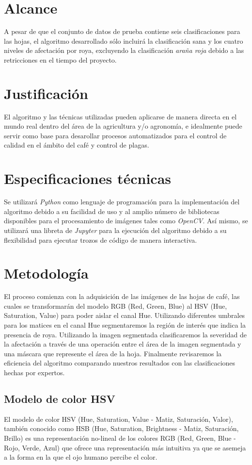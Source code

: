 \section{Alcance}
A pesar de que el conjunto de datos de prueba contiene seis clasificaciones para las hojas, el algoritmo desarrollado sólo incluirá la clasificación sana y los cuatro niveles de afectación por roya, excluyendo la clasificación \textit{araña roja} debido a las retricciones en el tiempo del proyecto.

\section{Justificación}
El algoritmo y las técnicas utilizadas pueden aplicarse de manera directa en el mundo real dentro del área de la agricultura y/o agronomía, e idealmente puede servir como base para desarollar procesos automatizados para el control de calidad en el ámbito del café y control de plagas.
 
\section{Especificaciones técnicas}
Se utilizará \textit{Python} como lenguaje de programación para la implementación del algoritmo debido a su facilidad de uso y al amplio número de bibliotecas disponibles para el procesamiento de imágenes tales como \textit{OpenCV}. Así mismo, se utilizará una libreta de \textit{Jupyter} para la ejecución del algoritmo debido a su flexibilidad para ejecutar trozos de código de manera interactiva.

\section{Metodología}
El proceso comienza con la adquisición de las imágenes de las hojas de café, las cuales se transformarán del modelo RGB (Red, Green, Blue) al HSV (Hue, Saturation, Value) para poder aislar el canal Hue. Utilizando diferentes umbrales para los matices en el canal Hue segmentaremos la región de interés que indica la presencia de roya. Utilizando la imagen segmentada clasificaremos la severidad de la afectación a través de una operación entre el área de la imagen segmentada y una máscara que represente el área de la hoja. Finalmente revisaremos la eficiencia del algoritmo comparando nuestros resultados con las clasificaciones hechas por expertos.

\subsection{Modelo de color HSV}
El modelo de color HSV (Hue, Saturation, Value - Matiz, Saturación, Valor), también conocido como HSB (Hue, Saturation, Brightness - Matiz, Saturación, Brillo) es una representación no-lineal de los colores RGB (Red, Green, Blue - Rojo, Verde, Azul) que ofrece una representación más intuitiva ya que se asemeja a la forma en la que el ojo humano percibe el color.

